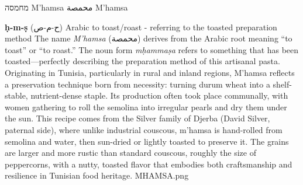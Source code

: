 
\multilingualrecipetitle
    {\texthebrew{מחמסה}}
    {M'hamsa}
    {\textarabic{محمصة}}
    {M'hamsa}

\leftpagecontent
    {\textbf{ḥ-m-ṣ} (\textarabic{ح-م-ص})}
    {Arabic}
    {to toast/roast - referring to the toasted preparation method}
    {The name \textit{M'hamsa} (\textarabic{محمصة}) derives from the Arabic root meaning ``to toast'' or ``to roast.'' The noun form \textit{mḥammaṣa} refers to something that has been toasted---perfectly describing the preparation method of this artisanal pasta.}
    {Originating in Tunisia, particularly in rural and inland regions, M'hamsa reflects a preservation technique born from necessity: turning durum wheat into a shelf-stable, nutrient-dense staple. Its production often took place communally, with women gathering to roll the semolina into irregular pearls and dry them under the sun. This recipe comes from the Silver family of Djerba (David Silver, paternal side), where unlike industrial couscous, m'hamsa is hand-rolled from semolina and water, then sun-dried or lightly toasted to preserve it. The grains are larger and more rustic than standard couscous, roughly the size of peppercorns, with a nutty, toasted flavor that embodies both craftsmanship and resilience in Tunisian food heritage.}
    {MHAMSA.png}

\clearpage

